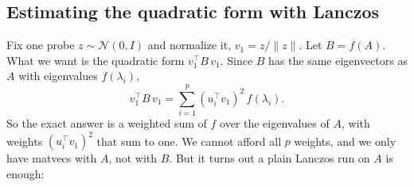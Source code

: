 \documentclass[11pt]{article}
\newtheorem*{resultbox}{Result}
\begin{document}


\subsection{Estimating the quadratic form with Lanczos}

Fix one probe $z \sim \mathcal{N}(0, I)$ and normalize it, $v_1 = z/\|z\|$. Let $B = f(A)$. What we want is the quadratic form $v_1^\top B\, v_1$. Since $B$ has the same eigenvectors as $A$ with eigenvalues $f(\lambda_i)$,
\[
v_1^\top B\, v_1 = \sum_{i=1}^{p} (u_i^\top v_1)^2\, f(\lambda_i) .
\]
So the exact answer is a weighted sum of $f$ over the eigenvalues of $A$, with weights $(u_i^\top v_1)^2$ that sum to one. We cannot afford all $p$ weights, and we only have matvecs with $A$, not with $B$. But it turns out a plain Lanczos run on $A$ is enough:

\end{document}
